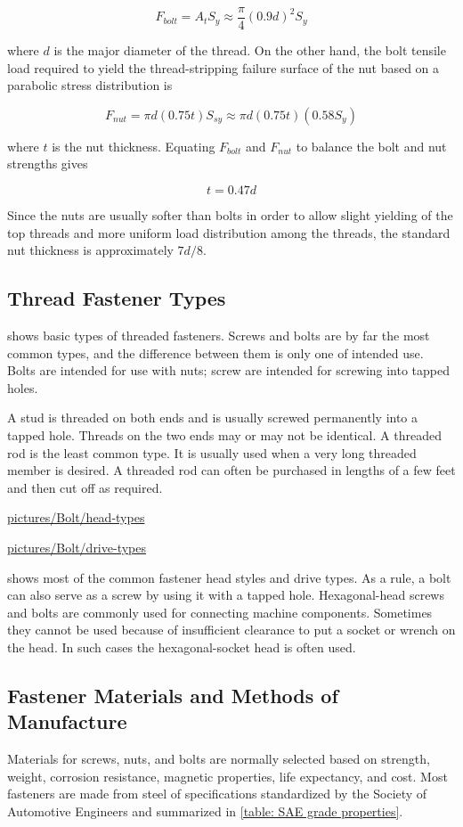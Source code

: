 \documentclass[a4paper,openany,nobib]{tufte-book}
\begin{document}
{{$$F_{bolt} = A_tS_y \approx \frac{\pi}{4}(0.9d)^2S_y$$

where \(d\) is the major diameter of the thread. On the other hand, the
bolt tensile load required to yield the thread-stripping failure surface
of the nut based on a parabolic stress distribution is

$$F_{nut} = \pi d(0.75t)S_{sy} \approx \pi d(0.75t)(0.58S_y)$$

where \(t\) is the nut thickness. Equating \(F_{bolt}\) and \(F_{nut}\) to
balance the bolt and nut strengths gives


$$\label{eqn: required nut thickness}
  t = 0.47d$$

Since the nuts are usually softer than bolts in order to allow slight
yielding of the top threads and more uniform load distribution among the
threads, the standard nut thickness is approximately \(7d/8\).

\subsection{Thread Fastener Types}
\label{thread-fastener-types}
shows basic types of threaded fasteners. Screws and bolts are by far the
most common types, and the difference between them is only one of
intended use. Bolts are intended for use with nuts; screw are intended
for screwing into tapped holes.


A stud is threaded on both ends and is usually screwed permanently into
a tapped hole. Threads on the two ends may or may not be identical. A
threaded rod is the least common type. It is usually used when a very
long threaded member is desired. A threaded rod can often be purchased
in lengths of a few feet and then cut off as required.


\url{pictures/Bolt/head-types}


\url{pictures/Bolt/drive-types}

shows most of the common fastener head styles and drive types. As a
rule, a bolt can also serve as a screw by using it with a tapped hole.
Hexagonal-head screws and bolts are commonly used for connecting machine
components. Sometimes they cannot be used because of insufficient
clearance to put a socket or wrench on the head. In such cases the
hexagonal-socket head is often used.

\subsection{Fastener Materials and Methods of Manufacture}
\label{fastener-materials-and-methods-of-manufacture}
Materials for screws, nuts, and bolts are normally selected based on
strength, weight, corrosion resistance, magnetic properties, life
expectancy, and cost. Most fasteners are made from steel of
specifications standardized by the Society of Automotive Engineers and
summarized in \ref{table: SAE grade properties}.

}}
\end{document}
